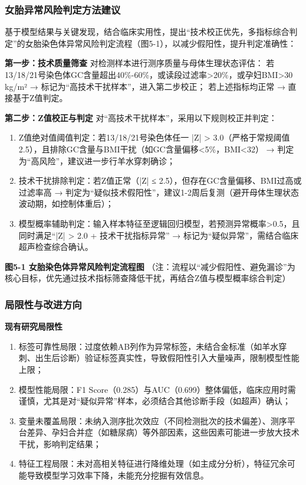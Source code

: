 \documentclass[withoutpreface,bwprint]{cumcmthesis} %
\begin{document}
\subsubsection{女胎异常风险判定方法建议}
基于模型结果与关键发现，结合临床实用性，提出“技术校正优先，多指标综合判定”的女胎染色体异常风险判定流程（图5-1），以减少假阳性，提升判定准确性：

\textbf{第一步：技术质量筛查}
对检测样本进行测序质量与母体生理状态评估：  
若13/18/21号染色体GC含量超出40\%-60\%，或读段过滤率>20\%，或孕妇BMI>30 kg/m² → 标记为“高技术干扰样本”，进入第二步校正；  
若上述指标均正常 → 直接基于Z值判定。

\textbf{第二步：Z值校正与判定}
对“高技术干扰样本”，采用以下规则校正并判定：
\begin{enumerate}
    \item Z值绝对值阈值判定：若13/18/21号染色体任一 |Z| > 3.0（严格于常规阈值2.5），且排除GC含量与BMI干扰（如GC含量偏移<5\%，BMI<32） → 判定为“高风险”，建议进一步行羊水穿刺确诊；
    \item 技术干扰排除判定：若Z值正常（|Z| ≤ 2.5），但存在GC含量偏移、BMI过高或过滤率高 → 判定为“疑似技术假阳性”，建议1-2周后复测（避开母体生理状态波动期，如控制体重后）；
    \item 模型概率辅助判定：输入样本特征至逻辑回归模型，若预测异常概率>0.5，且同时满足“|Z| > 2.0 + 技术干扰指标异常” → 标记为“疑似异常”，需结合临床超声检查综合确认。
\end{enumerate}

\textbf{图5-1 女胎染色体异常风险判定流程图}
（注：流程以“减少假阳性、避免漏诊”为核心目标，优先通过技术指标筛查降低干扰，再结合Z值与模型概率综合判定）


\subsubsection{局限性与改进方向}
\textbf{现有研究局限性}
\begin{enumerate}
    \item 标签可靠性局限：过度依赖AB列作为异常标签，未结合金标准（如羊水穿刺、出生后诊断）验证标签真实性，导致假阳性引入大量噪声，限制模型性能上限；
    \item 模型性能局限：F1 Score（0.285）与AUC（0.699）整体偏低，临床应用时需谨慎，尤其是对“疑似异常”样本，必须结合其他诊断手段（如超声）确认；
    \item 变量未覆盖局限：未纳入测序批次效应（不同检测批次的技术偏差）、测序平台差异、孕妇合并症（如糖尿病）等外部因素，这些因素可能进一步放大技术干扰，影响判定结果；
    \item 特征工程局限：未对高相关特征进行降维处理（如主成分分析），特征冗余可能导致模型学习效率下降，未能充分挖掘有效信息。
\end{enumerate}
\end{document}
